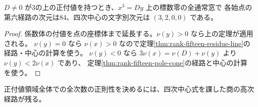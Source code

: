 \begin{corollary}
$D\ne0$ が3の上の正付値を持つとき、$x^3=Dy$ 上の標数零の全通常窓で
各始点の第六経路の次元は84、四次中心の文字別次元は $(3,2,0,0)$ である。
\end{corollary}
\begin{proof}
係数体の付値を点の座標体まで延長する。$\nu(y)>0$ なら上の定理が適用される。
$\nu(y)=0$ なら $\nu(x)>0$ なので定理\ref{thm:rank-fifteen-residue-line}の経路・中心の計算を使う。
$\nu(y)<0$ なら $3\nu(x)=\nu(D)+\nu(y)$ より $\nu(y)<2\nu(x)$ であり、
定理\ref{thm:rank-fifteen-pole-cone}の経路と中心の計算を使う。
\end{proof}
正付値領域全体での全次数の正則性を決めるには、四次中心式を課した商の高次経路が残る。

